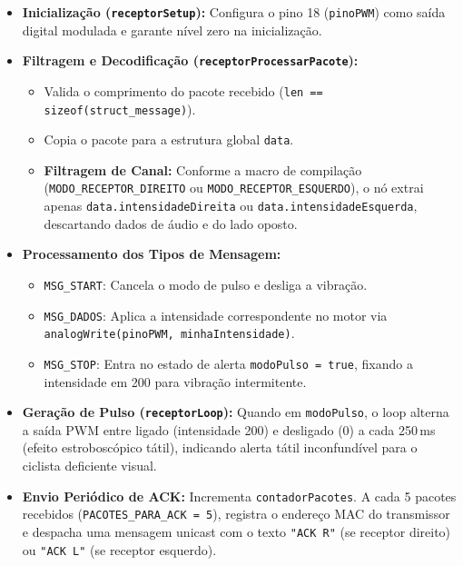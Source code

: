 \documentclass[12pt,a4paper]{article}
\begin{document}
\begin{itemize}
    \item \textbf{Inicialização (\texttt{receptorSetup}):} Configura o pino 18 (\texttt{pinoPWM}) como saída digital modulada e garante nível zero na inicialização.
    \item \textbf{Filtragem e Decodificação (\texttt{receptorProcessarPacote}):}
    \begin{itemize}
        \item Valida o comprimento do pacote recebido (\texttt{len == sizeof(struct\_message)}).
        \item Copia o pacote para a estrutura global \texttt{data}.
        \item \textbf{Filtragem de Canal:} Conforme a macro de compilação (\texttt{MODO\_RECEPTOR\_DIREITO} ou \texttt{MODO\_RECEPTOR\_ESQUERDO}), o nó extrai apenas \texttt{data.intensidadeDireita} ou \texttt{data.intensidadeEsquerda}, descartando dados de áudio e do lado oposto.
    \end{itemize}
    \item \textbf{Processamento dos Tipos de Mensagem:}
    \begin{itemize}
        \item \texttt{MSG\_START}: Cancela o modo de pulso e desliga a vibração.
        \item \texttt{MSG\_DADOS}: Aplica a intensidade correspondente no motor via \texttt{analogWrite(pinoPWM, minhaIntensidade)}.
        \item \texttt{MSG\_STOP}: Entra no estado de alerta \texttt{modoPulso = true}, fixando a intensidade em 200 para vibração intermitente.
    \end{itemize}
    \item \textbf{Geração de Pulso (\texttt{receptorLoop}):} Quando em \texttt{modoPulso}, o loop alterna a saída PWM entre ligado (intensidade 200) e desligado (0) a cada 250\,ms (efeito estroboscópico tátil), indicando alerta tátil inconfundível para o ciclista deficiente visual.
    \item \textbf{Envio Periódico de ACK:} Incrementa \texttt{contadorPacotes}. A cada 5 pacotes recebidos (\texttt{PACOTES\_PARA\_ACK = 5}), registra o endereço MAC do transmissor e despacha uma mensagem unicast com o texto \texttt{"ACK R"} (se receptor direito) ou \texttt{"ACK L"} (se receptor esquerdo).
\end{itemize}

\end{document}
